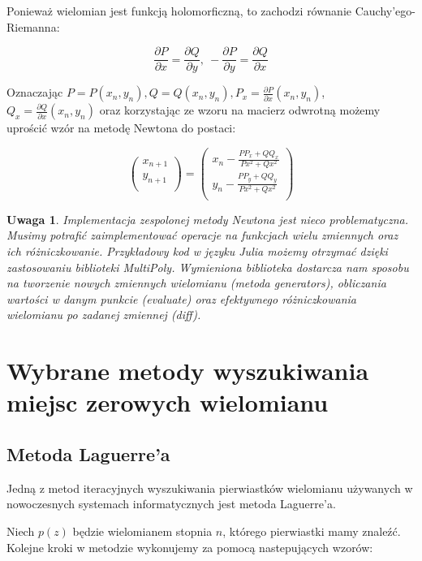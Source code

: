 \documentclass{article}
\newtheorem{remark}{Uwaga}
\begin{document}
Ponieważ wielomian jest funkcją holomorficzną, to zachodzi równanie Cauchy'ego-Riemanna:

$$\frac{\partial P}{\partial x} = \frac{\partial Q}{\partial y}, \ - \frac{\partial P}{\partial y} =\frac{\partial Q}{\partial x}$$

Oznaczając $P = P(x_n, y_n), Q = Q(x_n, y_n), P_x = \frac{\partial P}{\partial x}(x_n, y_n)$, $Q_x = \frac{\partial Q}{\partial x}(x_n, y_n)$ oraz korzystając ze wzoru na macierz odwrotną możemy uprościć wzór na metodę Newtona do postaci:

$$
\begin{pmatrix} x_{n+1}\\ y_{n+1}\\ \end{pmatrix} = \begin{pmatrix} x_n - \frac{ P P_x + Q Q_x}{Px^2 + Qx^2}\\ y_n - \frac{P P_y + Q Q_y}{Px^2 + Qx^2} \\ \end{pmatrix}
$$


\begin{remark}
Implementacja zespolonej metody Newtona jest nieco problematyczna. Musimy potrafić zaimplementować operacje na funkcjach wielu zmiennych oraz ich różniczkowanie. Przykładowy kod w języku Julia możemy otrzymać dzięki zastosowaniu biblioteki MultiPoly. Wymieniona biblioteka dostarcza nam sposobu na tworzenie nowych zmiennych wielomianu (metoda generators), obliczania wartości w danym punkcie (evaluate) oraz efektywnego różniczkowania wielomianu po zadanej zmiennej (diff).  \end{remark}


\lstset{language=Julia, label=DescriptiveLabel, frame=shadowbox}


\section{Wybrane metody wyszukiwania miejsc zerowych wielomianu}

\subsection{Metoda Laguerre'a}

Jedną z metod iteracyjnych wyszukiwania pierwiastków wielomianu używanych w nowoczesnych systemach informatycznych jest metoda Laguerre'a. 

Niech $p(z)$ będzie wielomianem stopnia $n$, którego pierwiastki mamy znaleźć. Kolejne kroki w metodzie wykonujemy za pomocą nastepujących wzorów:
\end{document}

